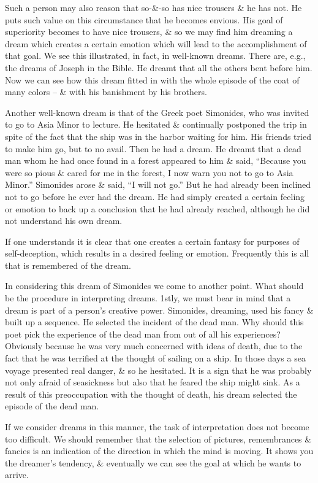 \documentclass{article}
\begin{document}
Such a person may also reason that so-\&-so has nice trousers \& he has not. He puts such value on this circumstance that he becomes envious. His goal of superiority becomes to have nice trousers, \& so we may find him dreaming a dream which creates a certain emotion which will lead to the accomplishment of that goal. We see this illustrated, in fact, in well-known dreams. There are, e.g., the dreams of Joseph in the Bible. He dreamt that all the others bent before him. Now we can see how this dream fitted in with the whole episode of the coat of many colors -- \& with his banishment by his brothers.

Another well-known dream is that of the Greek poet Simonides, who was invited to go to Asia Minor to lecture. He hesitated \& continually postponed the trip in spite of the fact that the ship was in the harbor waiting for him. His friends tried to make him go, but to no avail. Then he had a dream. He dreamt that a dead man whom he had once found in a forest appeared to him \& said, ``Because you were so pious \& cared for me in the forest, I now warn you not to go to Asia Minor.'' Simonides arose \& said, ``I will not go.'' But he had already been inclined not to go before he ever had the dream. He had simply created a certain feeling or emotion to back up a conclusion that he had already reached, although he did not understand his own dream.

If one understands it is clear that one creates a certain fantasy for purposes of self-deception, which results in a desired feeling or emotion. Frequently this is all that is remembered of the dream.

In considering this dream of Simonides we come to another point. What should be the procedure in interpreting dreams. 1stly, we must bear in mind that a dream is part of a person's creative power. Simonides, dreaming, used his fancy \& built up a sequence. He selected the incident of the dead man. Why should this poet pick the experience of the dead man from out of all his experiences? Obviously because he was very much concerned with ideas of death, due to the fact that he was terrified at the thought of sailing on a ship. In those days a sea voyage presented real danger, \& so he hesitated. It is a sign that he was probably not only afraid of seasickness but also that he feared the ship might sink. As a result of this preoccupation with the thought of death, his dream selected the episode of the dead man.

If we consider dreams in this manner, the task of interpretation does not become too difficult. We should remember that the selection of pictures, remembrances \& fancies is an indication of the direction in which the mind is moving. It shows you the dreamer's tendency, \& eventually we can see the goal at which he wants to arrive.
\end{document}
